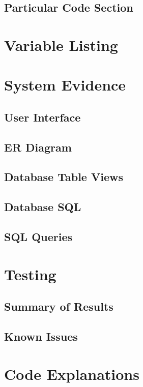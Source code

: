 \subsection{Particular Code Section}

\section{Variable Listing}

\section{System Evidence}

\subsection{User Interface}

\subsection{ER Diagram}

\subsection{Database Table Views}

\subsection{Database SQL}

\subsection{SQL Queries}

\section{Testing}

\subsection{Summary of Results}

\subsection{Known Issues}

\section{Code Explanations}


